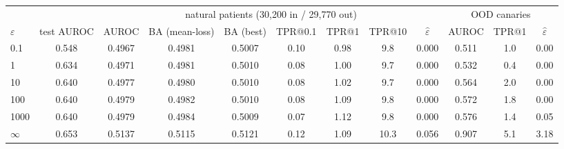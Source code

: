 \begin{tabular}{lc|ccccccc|ccc}
\toprule
& & \multicolumn{7}{c|}{natural patients (30,200 in / 29,770 out)} & \multicolumn{3}{c}{OOD canaries}\\
$\varepsilon$ & test AUROC & AUROC & BA (mean-loss) & BA (best) & TPR@0.1 & TPR@1 & TPR@10 & $\hat\varepsilon$ & AUROC & TPR@1 & $\hat\varepsilon$\\
\midrule
0.1 & 0.548 & 0.4967 & 0.4981 & 0.5007 & 0.10 & 0.98 & 9.8 & 0.000 & 0.511 & 1.0 & 0.00 \\
1 & 0.634 & 0.4971 & 0.4981 & 0.5010 & 0.08 & 1.00 & 9.7 & 0.000 & 0.532 & 0.4 & 0.00 \\
10 & 0.640 & 0.4977 & 0.4980 & 0.5010 & 0.08 & 1.02 & 9.7 & 0.000 & 0.564 & 2.0 & 0.00 \\
100 & 0.640 & 0.4979 & 0.4982 & 0.5010 & 0.08 & 1.09 & 9.8 & 0.000 & 0.572 & 1.8 & 0.00 \\
1000 & 0.640 & 0.4979 & 0.4984 & 0.5009 & 0.07 & 1.12 & 9.8 & 0.000 & 0.576 & 1.4 & 0.05 \\
$\infty$ & 0.653 & 0.5137 & 0.5115 & 0.5121 & 0.12 & 1.09 & 10.3 & 0.056 & 0.907 & 5.1 & 3.18 \\
\bottomrule
\end{tabular}
